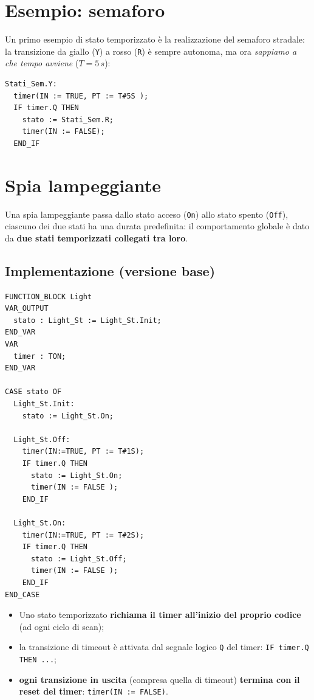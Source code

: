 \section{Esempio: semaforo}
Un primo esempio di stato temporizzato è la realizzazione del semaforo stradale: la transizione da giallo (\texttt{Y}) a rosso (\texttt{R}) è sempre autonoma, ma ora \emph{sappiamo a che tempo avviene} ($T = 5\,s$):
\begin{lstlisting}[basicstyle=\ttfamily\small]
Stati_Sem.Y:
  timer(IN := TRUE, PT := T#5S );
  IF timer.Q THEN
    stato := Stati_Sem.R;
    timer(IN := FALSE);
  END_IF
\end{lstlisting}

\section{Spia lampeggiante}
Una spia lampeggiante passa dallo stato acceso (\texttt{On}) allo stato spento (\texttt{Off}), ciascuno dei due stati ha una durata predefinita: il comportamento globale è dato da \textbf{due stati temporizzati collegati tra loro}.

\subsection{Implementazione (versione base)}
\begin{lstlisting}[basicstyle=\ttfamily\small]
FUNCTION_BLOCK Light
VAR_OUTPUT
  stato : Light_St := Light_St.Init;
END_VAR
VAR
  timer : TON;
END_VAR

CASE stato OF
  Light_St.Init:
    stato := Light_St.On;

  Light_St.Off:
    timer(IN:=TRUE, PT := T#1S);
    IF timer.Q THEN
      stato := Light_St.On;
      timer(IN := FALSE );
    END_IF

  Light_St.On:
    timer(IN:=TRUE, PT := T#2S);
    IF timer.Q THEN
      stato := Light_St.Off;
      timer(IN := FALSE );
    END_IF
END_CASE
\end{lstlisting}

\begin{note}
\begin{itemize}
    \item Uno stato temporizzato \textbf{richiama il timer all'inizio del proprio codice} (ad ogni ciclo di scan);
    \item la transizione di timeout è attivata dal segnale logico \texttt{Q} del timer: \texttt{IF timer.Q THEN ...};
    \item \textbf{ogni transizione in uscita} (compresa quella di timeout) \textbf{termina con il reset del timer}: \texttt{timer(IN := FALSE)}.
\end{itemize}
\end{note}

